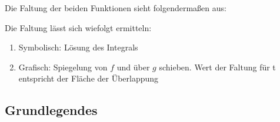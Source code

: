 
Die Faltung der beiden Funktionen sieht folgendermaßen aus:


Die Faltung lässt sich wiefolgt ermitteln:
\begin{enumerate}
	\item Symbolisch: Lösung des Integrals
	\item Grafisch: Spiegelung von $f$ und über $g$ schieben. Wert der Faltung für t entspricht der Fläche der Überlappung
\end{enumerate}

\subsection{Grundlegendes}

